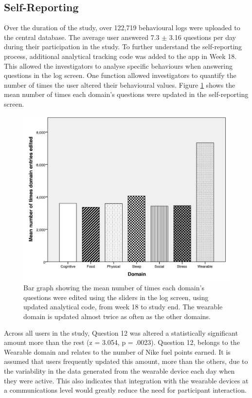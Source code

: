 \subsection{Self-Reporting}
Over the duration of the study, over 122,719 behavioural logs were uploaded to the central database. The average user answered 7.3 $ \pm $ 3.16 questions per day during their participation in the study. To further understand the self-reporting process, additional analytical tracking code was added to the app in Week 18. This allowed the investigators to analyse specific behaviours when answering questions in the log screen. One function allowed investigators to quantify the number of times the user altered their behavioural values. Figure \ref{fig: bargraph-questionedits} shows the mean number of times each domain's questions were updated in the self-reporting screen.

 \begin{figure}[h]
    \centering
    \includegraphics[scale=0.2, angle=0]{Files/prevention-study-3/figures/domain-edits}
    \caption{Bar graph showing the mean number of times each domain’s questions were edited using the sliders in the log screen, using updated analytical code, from week 18 to study end. The wearable domain is updated almost twice as often as the other domains.}
    \label{fig: bargraph-questionedits}
\end{figure}

Across all users in the study, Question 12 was altered a statistically significant amount more than the rest (z = 3.054, p = .0023). Question 12, belongs to the Wearable domain and relates to the number of Nike fuel points earned. It is assumed that users frequently updated this amount, more than the others, due to the variability in the data generated from the wearable device each day when they were active. This also indicates that integration with the wearable devices at a communications level would greatly reduce the need for participant interaction.

